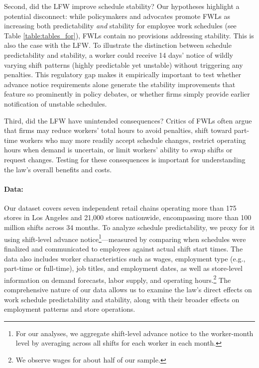 \documentclass[letterpaper,11pt,leqno]{article}
\theoremstyle{paper}
\begin{document}
Second, did the LFW improve schedule stability? Our hypotheses highlight a potential disconnect: while policymakers and advocates promote FWLs as increasing both predictability \textit{and} stability for employee work schedules (see Table \ref{table:tables_for}), FWLs contain no provisions addressing stability. This is also the case with the LFW. To illustrate the distinction between schedule predictability and stability, a worker could receive 14 days' notice of wildly varying shift patterns (highly predictable yet unstable) without triggering any penalties. This regulatory gap makes it empirically important to test whether advance notice requirements alone generate the stability improvements that feature so prominently in policy debates, or whether firms simply provide earlier notification of unstable schedules.

Third, did the LFW have unintended consequences? Critics of FWLs often argue that firms may reduce workers' total hours to avoid penalties, shift toward part-time workers who may more readily accept schedule changes, restrict operating hours when demand is uncertain, or limit workers' ability to swap shifts or request changes. Testing for these consequences is important for understanding the law's overall benefits and costs. 

\paragraph{Data:}
Our dataset covers seven independent retail chains operating more than 175 stores in Los Angeles and 21,000 stores nationwide, encompassing more than 100 million shifts across 34 months. To analyze schedule predictability, we proxy for it using shift-level advance notice\footnote{For our analyses, we aggregate shift-level advance notice to the worker-month level by averaging across all shifts for each worker in each month.}—measured by comparing when schedules were finalized and communicated to employees against actual shift start times. The data also includes worker characteristics such as wages, employment type (e.g., part-time or full-time), job titles, and employment dates, as well as store-level information on demand forecasts, labor supply, and operating hours.\footnote{We observe wages for about half of our sample.} The comprehensive nature of our data allows us to examine the law's direct effects on work schedule predictability and stability, along with their broader effects on employment patterns and store operations.
\end{document}
